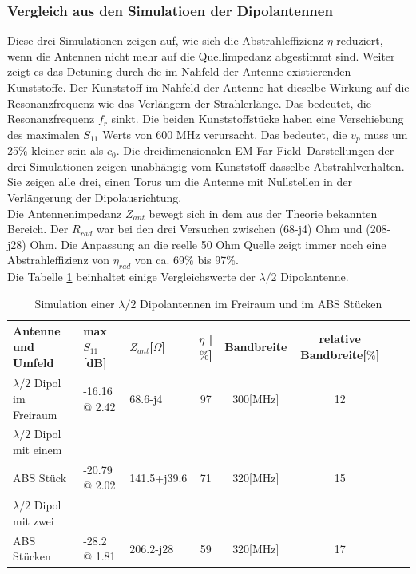 \subsubsection{Vergleich aus den Simulatioen der Dipolantennen}
Diese drei Simulationen zeigen auf, wie sich die Abstrahleffizienz $\eta$ reduziert, wenn die Antennen nicht mehr auf die Quellimpedanz abgestimmt sind. Weiter zeigt es das Detuning durch die im Nahfeld der Antenne existierenden Kunststoffe. Der Kunststoff im Nahfeld der Antenne hat dieselbe Wirkung auf die Resonanzfrequenz wie das Verlängern der  Strahlerlänge. Das bedeutet, die Resonanzfrequenz $f_{r}$ sinkt.  Die beiden Kunststoffstücke haben eine Verschiebung des maximalen $S_{11}$ Werts von 600 MHz verursacht. Das bedeutet, die $v_p$ muss um 25\% kleiner sein als $c_0$.
Die dreidimensionalen \glqq EM Far Field\grqq \  Darstellungen der drei Simulationen zeigen unabhängig vom Kunststoff dasselbe Abstrahlverhalten. Sie zeigen alle drei, einen Torus um die Antenne mit Nullstellen in der Verlängerung der Dipolausrichtung.\\
Die Antennenimpedanz $Z_{ant}$ bewegt sich in dem aus der Theorie bekannten Bereich. Der $R_{rad}$ war bei den drei Versuchen zwischen (68-j4) Ohm und  (208-j28) Ohm. Die Anpassung an die reelle 50 Ohm Quelle zeigt immer noch eine Abstrahleffizienz von $\eta_{rad}$ von   ca. 69\% bis 97\%.\\

Die Tabelle \ref{tab:Evaluation_Vergeich_Dipolantennen} beinhaltet einige Vergleichswerte der $\lambda/2$ Dipolantenne.
\begin{table}[!h]
  \centering
  \begin{tabular}{p{4cm} p{2cm} l  c c c c r} 
  \toprule 
  Antenne und Umfeld             & max $S_{11}$[dB]		& $Z_{ant}$[$\Omega$] 	& $\eta$ [$\%$] & Bandbreite & relative Bandbreite[$\%$]\\ 
  \midrule
$\lambda/2$ Dipol im Freiraum    			&	-16.16 @ 2.42		&  	68.6-j4			&   	97	&	300[MHz] & 12\\         		
$\lambda/2$ Dipol mit einem \\ABS Stück 	&   -20.79 @ 2.02  		&	141.5+j39.6		&	71	&	320[MHz]	 & 15\\
$\lambda/2$ Dipol mit zwei \\ABS Stücken 	&   -28.2 @ 1.81    	&	206.2-j28		&	59	&	320[MHz]	 & 17\\
 \bottomrule
  \end{tabular}
  \caption{Simulation einer $\lambda/2$ Dipolantennen im Freiraum und im ABS Stücken}
  \label{tab:Evaluation_Vergeich_Dipolantennen}
\end{table}



